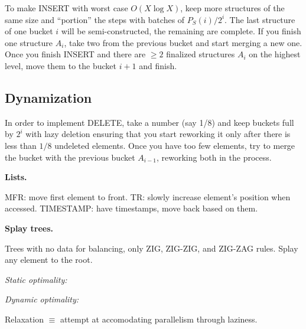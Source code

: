 To make INSERT with worst case $O(X \log X)$, keep more structures of
the same size and ``portion'' the steps with batches of
$P_S(i)/2^i$. The last structure of one bucket $i$ will be
semi-constructed, the remaining are complete. If you finish one
structure $A_i$, take two from the previous bucket and start merging a
new one.  Once you finish INSERT and there are $≥ 2$ finalized
structures $A_i$ on the highest level, move them to the bucket $i+1$
and finish.

\subsection{Dynamization}

In order to implement DELETE, take a number (say 1/8) and keep buckets
full by $2^i$ with lazy deletion ensuring that you start reworking it
only after there is less than $1/8$ undeleted elements. Once you have
too few elements, try to merge the bucket with the previous bucket
$A_{i-1}$, reworking both in the process.


{\bf Lists.}

\itemize\ibull
\: MFR: move first element to front. 
\: TR: slowly increase element's position when accessed.
\: TIMESTAMP: have timestamps, move back based on them.
\endlist




{\bf Splay trees.}

Trees with no data for balancing, only ZIG, ZIG-ZIG, and ZIG-ZAG rules.
Splay any element to the root.

{\it Static optimality:}

{\it Dynamic optimality:}


Relaxation $≡$ attempt at accomodating parallelism through laziness.

\bye

